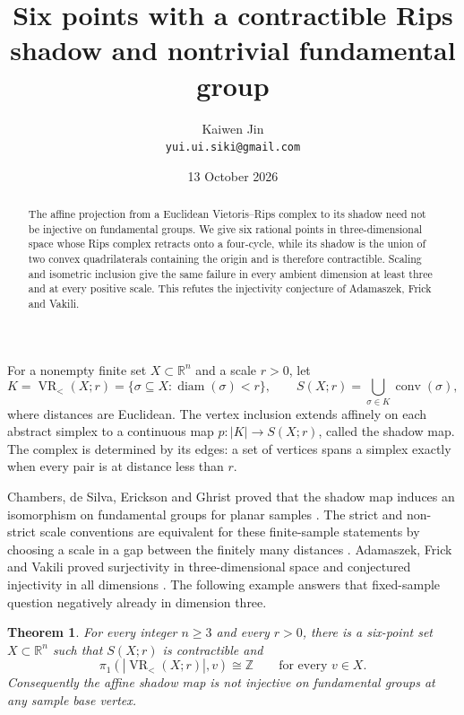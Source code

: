 \documentclass[11pt]{article}
\title{Six points with a contractible Rips shadow and nontrivial fundamental group}
\author{Kaiwen Jin\\\small\texttt{yui.ui.siki@gmail.com}}
\date{13 October 2026}
\newtheorem{theorem}{Theorem}
\newcommand{\VR}{\operatorname{VR}_{<}}
\newcommand{\conv}{\operatorname{conv}}
\begin{document}
\maketitle

\begin{abstract}
The affine projection from a Euclidean Vietoris--Rips complex to its shadow
need not be injective on fundamental groups. We give six rational points in
three-dimensional space whose Rips complex retracts onto a four-cycle, while
its shadow is the union of two convex quadrilaterals containing the origin
and is therefore contractible. Scaling and isometric inclusion give the same
failure in every ambient dimension at least three and at every positive scale.
This refutes the injectivity conjecture of Adamaszek, Frick and Vakili.
\end{abstract}

For a nonempty finite set $X\subset\mathbb R^n$ and a scale $r>0$, let
\[
 K=\VR(X;r)=\{\sigma\subseteq X:\operatorname{diam}(\sigma)<r\},
 \qquad
 S(X;r)=\bigcup_{\sigma\in K}\conv(\sigma),
\]
where distances are Euclidean. The vertex inclusion extends affinely on each
abstract simplex to a continuous map $p:|K|\to S(X;r)$, called the shadow map.
The complex is determined by its edges: a set of vertices spans a simplex
exactly when every pair is at distance less than $r$.

Chambers, de Silva, Erickson and Ghrist proved that the shadow map induces an
isomorphism on fundamental groups for planar samples
\cite[Theorem~3.1]{CDSEG}. The strict and non-strict scale conventions are
equivalent for these finite-sample statements by choosing a scale in a gap
between the finitely many distances \cite[Remark~1.4]{AFV}.
Adamaszek, Frick and Vakili proved surjectivity in three-dimensional space
\cite[Theorem~I]{AFV} and conjectured injectivity in all dimensions
\cite[Conjecture~7.2]{AFV}. The following example answers that fixed-sample
question negatively already in dimension three.

\begin{theorem}\label{thm:counterexample}
For every integer $n\ge3$ and every $r>0$, there is a six-point set
$X\subset\mathbb R^n$ such that $S(X;r)$ is contractible and
\[
 \pi_1(|\VR(X;r)|,v)\cong\mathbb Z
 \qquad\text{for every }v\in X.
\]
Consequently the affine shadow map is not injective on fundamental groups
at any sample base vertex.
\end{theorem}
\end{document}
